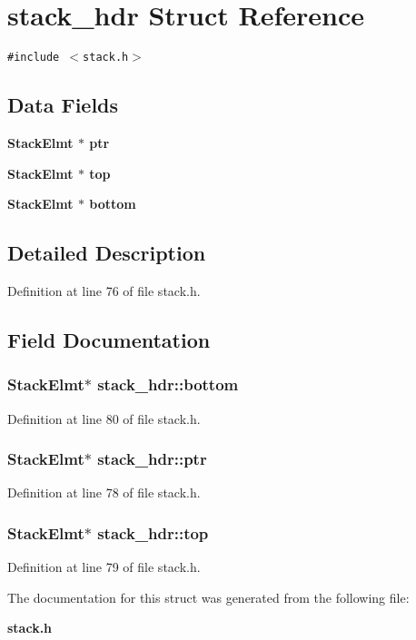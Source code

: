 \section{stack\_\-hdr Struct Reference}
\label{structstack__hdr}
{\tt \#include $<$stack.h$>$}

\subsection*{Data Fields}
\begin{CompactItemize}
\item 
\bf{Stack\-Elmt} $\ast$ \bf{ptr}
\item 
\bf{Stack\-Elmt} $\ast$ \bf{top}
\item 
\bf{Stack\-Elmt} $\ast$ \bf{bottom}
\end{CompactItemize}


\subsection{Detailed Description}




Definition at line 76 of file stack.h.

\subsection{Field Documentation}
\subsubsection{\setlength{\rightskip}{0pt plus 5cm}\bf{Stack\-Elmt}$\ast$ \bf{stack\_\-hdr::bottom}}\label{structstack__hdr_00876c3199f018ea830e41a74c05f748}




Definition at line 80 of file stack.h.
\subsubsection{\setlength{\rightskip}{0pt plus 5cm}\bf{Stack\-Elmt}$\ast$ \bf{stack\_\-hdr::ptr}}\label{structstack__hdr_24ce690c7aeab1fbc5bdf1f24b479d48}




Definition at line 78 of file stack.h.
\subsubsection{\setlength{\rightskip}{0pt plus 5cm}\bf{Stack\-Elmt}$\ast$ \bf{stack\_\-hdr::top}}\label{structstack__hdr_917aab16722a1f358e1c11f5be144c1a}




Definition at line 79 of file stack.h.

The documentation for this struct was generated from the following file:\begin{CompactItemize}
\item 
\bf{stack.h}\end{CompactItemize}
